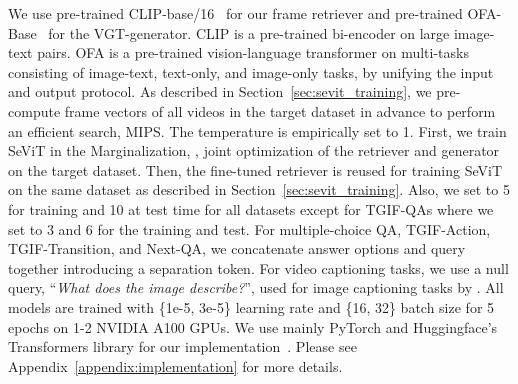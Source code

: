 \documentclass{article}
\newcommand{\frameworkname}{SeViT}
\begin{document}
We use pre-trained CLIP-base/16~\cite{radford2021learning} for our frame retriever and pre-trained OFA-Base~\cite{wang2022unifying} for the VGT-generator. CLIP is a pre-trained bi-encoder on large image-text pairs. OFA is a pre-trained vision-language transformer on multi-tasks consisting of image-text, text-only, and image-only tasks, by unifying the input and output protocol. As described in Section~\ref{sec:sevit_training}, we pre-compute frame vectors of all videos in the target dataset in advance to perform an efficient search, MIPS. The temperature  is empirically set to 1. First, we train \frameworkname{} in the Marginalization, \ie, joint optimization of the retriever and generator on the target dataset. Then, the fine-tuned retriever is reused for training \frameworkname{} on the same dataset as described in Section~\ref{sec:sevit_training}. Also, we set  to 5 for training and 10 at test time for all datasets except for TGIF-QAs where we set  to 3 and 6 for the training and test.
For multiple-choice QA, TGIF-Action, TGIF-Transition, and Next-QA, we concatenate answer options and query together introducing a separation token. For video captioning tasks, we use a null query, ``\textit{What does the image describe?}'', used for image captioning tasks by \citet{wang2022unifying}. All models are trained with \{1e-5, 3e-5\} learning rate and \{16, 32\} batch size for 5 epochs on 1-2 NVIDIA A100 GPUs. We use mainly PyTorch and Huggingface's Transformers library for our implementation~\cite{paszke2019pytorch, wolf2020transformers}. Please see Appendix~\ref{appendix:implementation} for more details.
\end{document}
